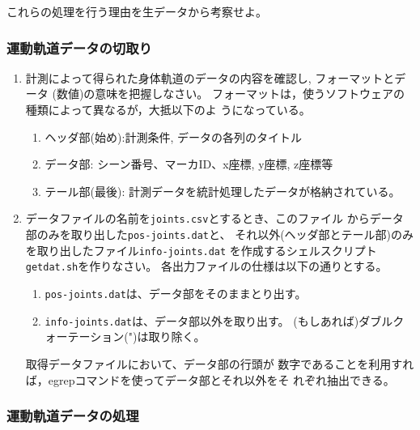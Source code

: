 \documentclass{jsarticle}
\begin{document}
これらの処理を行う理由を生データから考察せよ。

\subsubsection{運動軌道データの切取り}

\begin{enumerate}
\item 計測によって得られた身体軌道のデータの内容を確認し, フォーマットとデータ
  (数値)の意味を把握しなさい。
  フォーマットは，使うソフトウェアの種類によって異なるが，大抵以下のよ
  うになっている。
  \begin{enumerate}
  \item ヘッダ部(始め):計測条件, データの各列のタイトル
  \item データ部: シーン番号、マーカID、x座標, y座標, z座標等
  \item テール部(最後): 計測データを統計処理したデータが格納されている。
  \end{enumerate}
\item データファイルの名前を\verb|joints.csv|とするとき、このファイル
  からデータ部のみを取り出した\verb|pos-joints.dat|と、
  それ以外(ヘッダ部とテール部)のみを取り出したファイル\verb|info-joints.dat|
  を作成するシェルスクリプト\verb|getdat.sh|を作りなさい。
  各出力ファイルの仕様は以下の通りとする。
  \begin{enumerate}
  \item \verb|pos-joints.dat|は、データ部をそのままとり出す。
  \item \verb|info-joints.dat|は、データ部以外を取り出す。
    (もしあれば)ダブルクォーテーション(")は取り除く。
  \end{enumerate}
  取得データファイルにおいて、データ部の行頭が
  数字であることを利用すれば，egrepコマンドを使ってデータ部とそれ以外をそ
  れぞれ抽出できる。
\end{enumerate}


\subsubsection{運動軌道データの処理}
\end{document}
